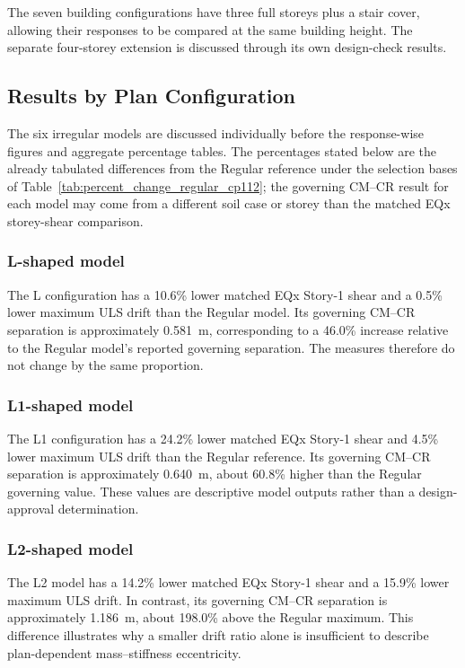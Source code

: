 The seven building configurations have three full storeys plus a stair cover, allowing their responses to be compared at the same building height. The separate four-storey extension is discussed through its own design-check results.

\subsection{Results by Plan Configuration}
The six irregular models are discussed individually before the response-wise figures and aggregate percentage tables. The percentages stated below are the already tabulated differences from the Regular reference under the selection bases of Table~\ref{tab:percent_change_regular_cp112}; the governing CM--CR result for each model may come from a different soil case or storey than the matched EQx storey-shear comparison.

\subsubsection{L-shaped model}
The L configuration has a 10.6\% lower matched EQx Story-1 shear and a 0.5\% lower maximum ULS drift than the Regular model. Its governing CM--CR separation is approximately 0.581~m, corresponding to a 46.0\% increase relative to the Regular model's reported governing separation. The measures therefore do not change by the same proportion.

\subsubsection{L1-shaped model}
The L1 configuration has a 24.2\% lower matched EQx Story-1 shear and 4.5\% lower maximum ULS drift than the Regular reference. Its governing CM--CR separation is approximately 0.640~m, about 60.8\% higher than the Regular governing value. These values are descriptive model outputs rather than a design-approval determination.

\subsubsection{L2-shaped model}
The L2 model has a 14.2\% lower matched EQx Story-1 shear and a 15.9\% lower maximum ULS drift. In contrast, its governing CM--CR separation is approximately 1.186~m, about 198.0\% above the Regular maximum. This difference illustrates why a smaller drift ratio alone is insufficient to describe plan-dependent mass--stiffness eccentricity.

